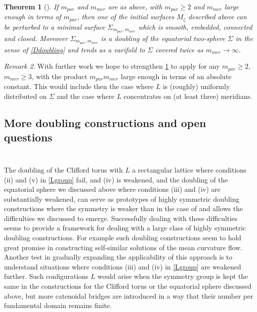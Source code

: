 \documentclass[12pt,namelimits,sumlimits]{amsart}
\newtheorem{theorem}{Theorem}[section]
\theoremstyle{remark}
\newtheorem{remark}[theorem]{Remark}
\numberwithin{equation}{section}
\begin{document}
\addtocounter{equation}{1}
\begin{theorem}[\mbox{\cite{kapouleas:equator}}]
\label{Tequator}
If ${{m_{par}}}$ and ${{m_{mer}}}$ are as above, with ${{m_{par}}}\ge2$ and ${{m_{mer}}}$ large enough in terms of ${{m_{par}}}$,
then one of the initial surfaces $M_\zeta$ described above
can be perturbed to a minimal surface $\Sigma_{{{m_{par}}},{{m_{mer}}}}$
which is smooth, embedded, connected and closed.
Moreover $\Sigma_{{{m_{par}}},{{m_{mer}}}}$ is a doubling of the equatorial two-sphere $\Sigma$
in the sense of \ref{Ddoubling}
and tends as a varifold to $\Sigma$ covered twice as ${{m_{mer}}}\to\infty$.
\end{theorem}

\addtocounter{equation}{1}
\begin{remark}
\label{Requatorcases}
With further work we hope to strengthen \ref{Tequator}
to apply for any ${{m_{par}}}\ge2$, ${{m_{mer}}}\ge3$, with the product
${{m_{par}}}{{m_{mer}}}$ large enough in terms of an absolute constant.
This would include then the case where $L$ is (roughly) uniformly distributed on $\Sigma$
and the case where $L$ concentrates on (at least three) meridians.
\end{remark}

\subsection*{More doubling constructions and open questions}
$\phantom{ab}$
\nopagebreak

The doubling of the Clifford torus with $L$ a rectangular lattice where conditions (ii) and (v) in \ref{Lgroup} fail,
and (iv) is weakened,
and the doubling of the equatorial sphere we discussed above where conditions (iii) and (iv) are substantially weakened,
can serve as prototypes of highly symmetric doubling constructions where the symmetry is weaker than in the case of \cite{kapouleas:clifford}
and allows the difficulties we discussed to emerge.
Successfully dealing with these difficulties
seems to provide a framework for dealing with a large class of highly symmetric doubling constructions.
For example such doubling constructions seem to hold great promise in constructing self-similar solutions of the mean curvature flow.
Another test in gradually expanding the applicability of this approach is to understand
situations where conditions (iii) and (iv) in \ref{Lgroup} are weakened further.
Such configurations $L$ would arise when the symmetry group is kept the same in the constructions
for the Clifford torus or the equatorial sphere discussed above,
but more catenoidal bridges are introduced
in a way that their number per fundamental domain remains finite.
\end{document}
